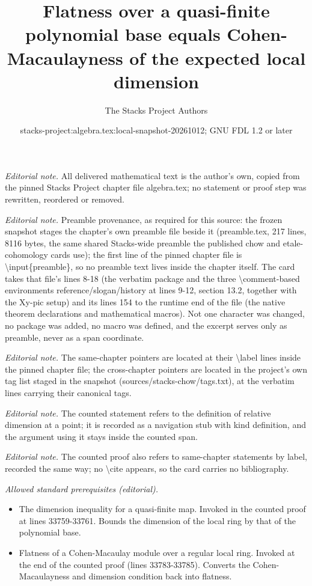 \documentclass[10pt,a4paper]{amsart}
\title{Flatness over a quasi-finite polynomial base equals Cohen-Macaulayness of the expected local dimension}
\author{The Stacks Project Authors}
\date{stacks-project:algebra.tex:local-snapshot-20261012; GNU FDL 1.2 or later}
\theoremstyle{plain}
\theoremstyle{definition}
\theoremstyle{remark}
\numberwithin{equation}{subsection}
\begin{document}
\maketitle
\noindent\textit{Editorial note.} All delivered mathematical text is the author's own, copied from the pinned Stacks Project chapter file algebra.tex; no statement or proof step was rewritten, reordered or removed.\par\medskip
\noindent\textit{Editorial note.} Preamble provenance, as required for this source: the frozen snapshot stages the chapter's own preamble file beside it (preamble.tex, 217 lines, 8116 bytes, the same shared Stacks-wide preamble the published chow and etale-cohomology cards use); the first line of the pinned chapter file is \textbackslash{}input\{preamble\}, so no preamble text lives inside the chapter itself. The card takes that file's lines 8-18 (the verbatim package and the three \textbackslash{}comment-based environments reference/slogan/history at lines 9-12, section 13.2, together with the Xy-pic setup) and its lines 154 to the runtime end of the file (the native theorem declarations and mathematical macros). Not one character was changed, no package was added, no macro was defined, and the excerpt serves only as preamble, never as a span coordinate.\par\medskip
\noindent\textit{Editorial note.} The same-chapter pointers are located at their \textbackslash{}label lines inside the pinned chapter file; the cross-chapter pointers are located in the project's own tag list staged in the snapshot (sources/stacks-chow/tags.txt), at the verbatim lines carrying their canonical tags.\par\medskip
\noindent\textit{Editorial note.} The counted statement refers to the definition of relative dimension at a point; it is recorded as a navigation stub with kind definition, and the argument using it stays inside the counted span.\par\medskip
\noindent\textit{Editorial note.} The counted proof also refers to same-chapter statements by label, recorded the same way; no \textbackslash{}cite appears, so the card carries no bibliography.\par\medskip
\noindent\textit{Allowed standard prerequisites (editorial).}\begin{itemize}
\item The dimension inequality for a quasi-finite map. Invoked in the counted proof at lines 33759-33761. Bounds the dimension of the local ring by that of the polynomial base.
\item Flatness of a Cohen-Macaulay module over a regular local ring. Invoked at the end of the counted proof (lines 33783-33785). Converts the Cohen-Macaulayness and dimension condition back into flatness.
\end{itemize}\medskip
\end{document}
